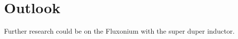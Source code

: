 \chapter{Outlook}\label{chap:outlook}

Further research could be on the Fluxonium with the super duper inductor. 